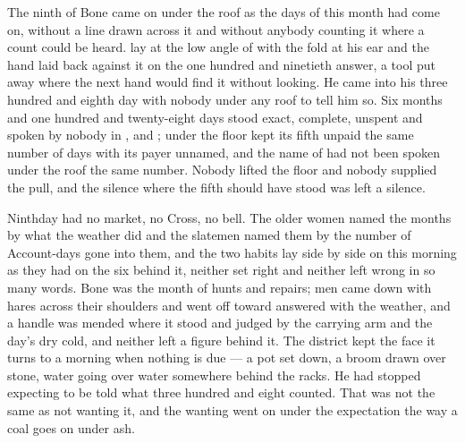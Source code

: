 
The ninth of Bone came on under the roof as the days of this month had come on, without a line drawn across it and without anybody counting it where a count could be heard.  lay at the low angle of  with the fold at his ear and the hand laid back against it on the one hundred and ninetieth answer, a tool put away where the next hand would find it without looking. He came into his three hundred and eighth day with nobody under any roof to tell him so. Six months and one hundred and twenty-eight days stood exact, complete, unspent and spoken by nobody in ,  and ; under the floor  kept its fifth unpaid the same number of days with its payer unnamed, and the name of  had not been spoken under the roof the same number. Nobody lifted the floor and nobody supplied the pull, and the silence where the fifth should have stood was left a silence.

Ninthday had no market, no Cross, no bell. The older women named the months by what the weather did and the slatemen named them by the number of Account-days gone into them, and the two habits lay side by side on this morning as they had on the six behind it, neither set right and neither left wrong in so many words. Bone was the month of hunts and repairs; men came down with hares across their shoulders and went off toward  answered with the weather, and a handle was mended where it stood and judged by the carrying arm and the day's dry cold, and neither left a figure behind it. The district kept the face it turns to a morning when nothing is due --- a pot set down, a broom drawn over stone, water going over water somewhere behind the racks. He had stopped expecting to be told what three hundred and eight counted. That was not the same as not wanting it, and the wanting went on under the expectation the way a coal goes on under ash.

